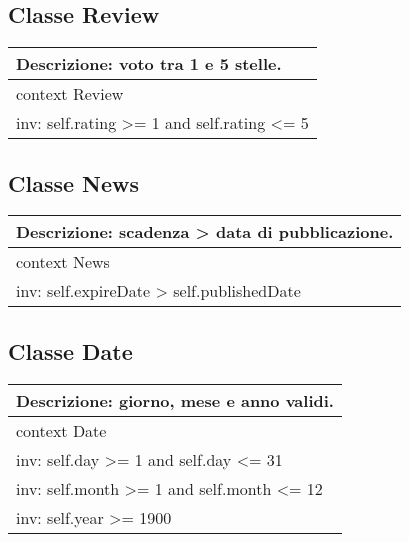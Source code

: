 \subsection{Classe Review}

\begin{table}[H]
  \centering
  \begin{tabular}{p{}}
    \toprule
    \textbf{Descrizione:} voto tra 1 e 5 stelle.\\
    \midrule
    context Review\\
    \quad inv: self.rating >= 1 and self.rating <= 5\\
    \bottomrule
  \end{tabular}
\end{table}
\FloatBarrier

\subsection{Classe News}

\begin{table}[H]
  \centering
  \begin{tabular}{p{}}
    \toprule
    \textbf{Descrizione:} scadenza > data di pubblicazione.\\
    \midrule
    context News\\
    \quad inv: self.expireDate > self.publishedDate\\
    \bottomrule
  \end{tabular}
\end{table}
\FloatBarrier

\subsection{Classe Date}

\begin{table}[H]
  \centering
  \begin{tabular}{p{}}
    \toprule
    \textbf{Descrizione:} giorno, mese e anno validi.\\
    \midrule
    context Date\\
    \quad inv: self.day >= 1 and self.day <= 31\\
    \quad inv: self.month >= 1 and self.month <= 12\\
    \quad inv: self.year >= 1900\\
    \bottomrule
  \end{tabular}
\end{table}
\FloatBarrier
